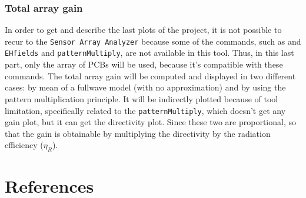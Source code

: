 \documentclass[12pt,a4paper]{article}
\begin{document}
{\subsubsection*{\selectfont\color{Turquoise}Total array gain}
In order to get and describe the last plots of the project, it is not possible to recur to the \texttt{\color{Mahogany}Sensor Array Analyzer} because some of the commands, such as  and \texttt{\color{Turquoise}EHfields} and \texttt{\color{Turquoise}patternMultiply}, are not available in this tool. Thus, in this last part, only the array of PCBs will be used, because it's compatible with these commands. The total array gain will be computed and displayed in two different cases: by mean of a fullwave model (with no approximation) and by using the pattern multiplication principle. It will be indirectly plotted because of tool limitation, specifically related to the \texttt{\color{Turquoise}patternMultiply}, which doesn't get any gain plot, but it can get the directivity plot. Since these two are proportional, so that the gain is obtainable by multiplying the directivity by the radiation efficiency ($\eta_R$). 







\section*{References}

\printbibliography

}
\end{document}
